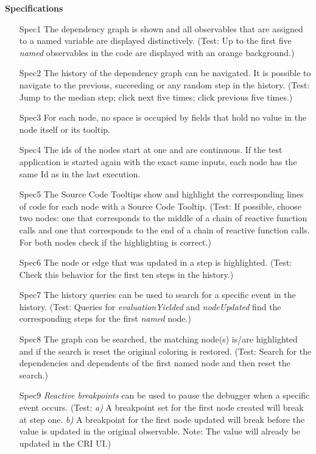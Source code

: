 \textbf{Specifications}
\begin{itemize}
	\item[Spec1] The dependency graph is shown and all observables that are assigned to a named variable are displayed distinctively. (Test: Up to the first five \emph{named} observables in the code are displayed with an orange background.)
	\item[Spec2] The history of the dependency graph can be navigated. It is possible to navigate to the previous, succeeding or any random step in the history. (Test: Jump to the median step; click next five times; click previous five times.)
	\item[Spec3] For each node, no space is occupied by fields that hold no value in the node itself or its tooltip.
	\item[Spec4] The ids of the nodes start at one and are continuous. If the test application is started again with the exact same inputs, each node has the same Id as in the last execution.
	\item[Spec5] The Source Code Tooltips show and highlight the corresponding lines of code for each node with a Source Code Tooltip. (Test: If possible, choose two nodes: one that corresponds to the middle of a chain of reactive function calls and one that corresponds to the end of a chain of reactive function calls. For both nodes check if the highlighting is correct.)
	\item[Spec6] The node or edge that was updated in a step is highlighted. (Test: Check this behavior for the first ten steps in the history.)
	\item[Spec7] The history queries can be used to search for a specific event in the history. (Test: Queries for \emph{evaluationYielded} and \emph{nodeUpdated} find the corresponding steps for the first \emph{named} node.)
	\item[Spec8] The graph can be searched, the matching node(s) is/are highlighted and if the search is reset the original coloring is restored. (Test: Search for the dependencies and dependents of the first named node and then reset the search.)
	\item[Spec9] \emph{Reactive breakpoints} can be used to pause the debugger when a specific event occurs. (Test: \emph{a)} A breakpoint set for the first node created will break at step one. \emph{b)} A breakpoint for the first node updated will break before the value is updated in the original observable. Note: The value will already be updated in the CRI UI.)
\end{itemize}

